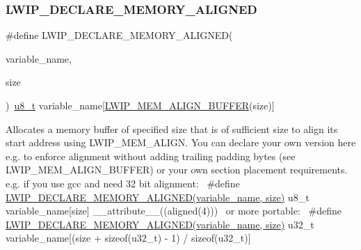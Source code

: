\subsubsection{\texorpdfstring{L\+W\+I\+P\+\_\+\+D\+E\+C\+L\+A\+R\+E\+\_\+\+M\+E\+M\+O\+R\+Y\+\_\+\+A\+L\+I\+G\+N\+ED}{LWIP\_DECLARE\_MEMORY\_ALIGNED}\hspace{0.1cm}{\footnotesize\ttfamily [1/2]}}
{\footnotesize\ttfamily \#define L\+W\+I\+P\+\_\+\+D\+E\+C\+L\+A\+R\+E\+\_\+\+M\+E\+M\+O\+R\+Y\+\_\+\+A\+L\+I\+G\+N\+ED(\begin{DoxyParamCaption}\item[{}]{variable\+\_\+name,  }\item[{}]{size }\end{DoxyParamCaption})~\hyperlink{group__compiler__abstraction_ga4caecabca98b43919dd11be1c0d4cd8e}{u8\+\_\+t} variable\+\_\+name\mbox{[}\hyperlink{group__compiler__abstraction_ga25591dcb72fccc7b5dc46fbc1959694e}{L\+W\+I\+P\+\_\+\+M\+E\+M\+\_\+\+A\+L\+I\+G\+N\+\_\+\+B\+U\+F\+F\+ER}(size)\mbox{]}}

Allocates a memory buffer of specified size that is of sufficient size to align its start address using L\+W\+I\+P\+\_\+\+M\+E\+M\+\_\+\+A\+L\+I\+GN. You can declare your own version here e.\+g. to enforce alignment without adding trailing padding bytes (see L\+W\+I\+P\+\_\+\+M\+E\+M\+\_\+\+A\+L\+I\+G\+N\+\_\+\+B\+U\+F\+F\+ER) or your own section placement requirements.~\newline
e.\+g. if you use gcc and need 32 bit alignment\+:~\newline
\#define \hyperlink{group__compiler__abstraction_ga651bb349041669fe717b19f127ef16c0}{L\+W\+I\+P\+\_\+\+D\+E\+C\+L\+A\+R\+E\+\_\+\+M\+E\+M\+O\+R\+Y\+\_\+\+A\+L\+I\+G\+N\+E\+D(variable\+\_\+name, size)} u8\+\_\+t variable\+\_\+name\mbox{[}size\mbox{]} \+\_\+\+\_\+attribute\+\_\+\+\_\+((aligned(4)))~\newline
or more portable\+:~\newline
\#define \hyperlink{group__compiler__abstraction_ga651bb349041669fe717b19f127ef16c0}{L\+W\+I\+P\+\_\+\+D\+E\+C\+L\+A\+R\+E\+\_\+\+M\+E\+M\+O\+R\+Y\+\_\+\+A\+L\+I\+G\+N\+E\+D(variable\+\_\+name, size)} u32\+\_\+t variable\+\_\+name\mbox{[}(size + sizeof(u32\+\_\+t) -\/ 1) / sizeof(u32\+\_\+t)\mbox{]} \mbox{\label{group__compiler__abstraction_ga651bb349041669fe717b19f127ef16c0}} 
